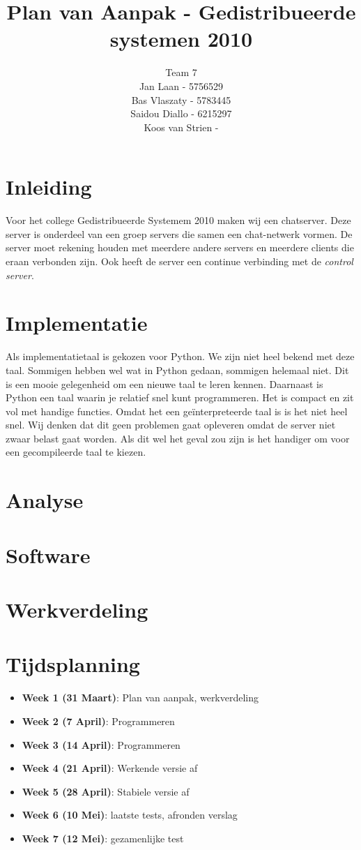 \documentclass[a4paper,10pt]{article}
\title{Plan van Aanpak - Gedistribueerde systemen 2010}
\author{Team 7 \\
Jan Laan - 5756529\\
Bas Vlaszaty - 5783445 \\
Saidou Diallo - 6215297\\
Koos van Strien - }
\begin{document}
  \maketitle
  
  \section{Inleiding}
  Voor het college Gedistribueerde Systemem 2010 maken wij een chatserver. Deze server is onderdeel van een groep servers die samen een chat-netwerk vormen. De server moet rekening houden met meerdere andere servers en meerdere clients die eraan verbonden zijn. Ook heeft de server een continue verbinding met de \textit{control server}.
  
  \section{Implementatie}
  Als implementatietaal is gekozen voor Python. We zijn niet heel bekend met deze taal. Sommigen hebben wel wat in Python gedaan, sommigen helemaal niet. Dit is een mooie gelegenheid om een nieuwe taal te leren kennen. Daarnaast is Python een taal waarin je relatief snel kunt programmeren. Het is compact en zit vol met handige functies. Omdat het een ge\"interpreteerde taal is is het niet heel snel. Wij denken dat dit geen problemen gaat opleveren omdat de server niet zwaar belast gaat worden. Als dit wel het geval zou zijn is het handiger om voor een gecompileerde taal te kiezen.

  \section{Analyse}

  \section{Software}

  \section{Werkverdeling}

  \section{Tijdsplanning}
  \begin{itemize}
    \item \textbf{Week 1 (31 Maart)}: Plan van aanpak, werkverdeling
    \item \textbf{Week 2 (7 April)}: Programmeren
    \item \textbf{Week 3 (14 April)}: Programmeren
    \item \textbf{Week 4 (21 April)}: Werkende versie af
    \item \textbf{Week 5 (28 April)}: Stabiele versie af
    \item \textbf{Week 6 (10 Mei)}: laatste tests, afronden verslag
    \item \textbf{Week 7 (12 Mei)}: gezamenlijke test

  \end{itemize}
\end{document}
